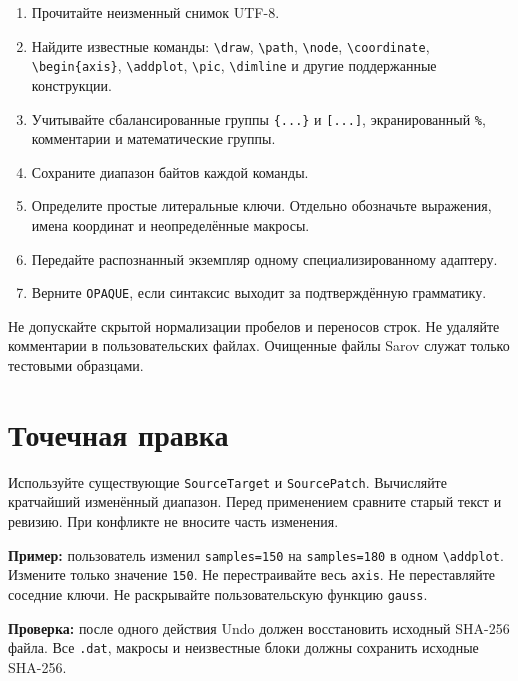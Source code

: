 \documentclass[11pt,a4paper,oneside]{scrreprt}
\providecommand{\tightlist}{\setlength{\itemsep}{0pt}\setlength{\parskip}{0pt}}
\begin{document}
\begin{enumerate}
\def\labelenumi{\arabic{enumi}.}
\tightlist
\item
  Прочитайте неизменный снимок UTF-8.
\item
  Найдите известные команды: \texttt{\textbackslash{}draw}, \texttt{\textbackslash{}path}, \texttt{\textbackslash{}node}, \texttt{\textbackslash{}coordinate}, \texttt{\textbackslash{}begin\{axis\}}, \texttt{\textbackslash{}addplot}, \texttt{\textbackslash{}pic}, \texttt{\textbackslash{}dimline} и другие поддержанные конструкции.
\item
  Учитывайте сбалансированные группы \texttt{\{...\}} и \texttt{{[}...{]}}, экранированный \texttt{\%}, комментарии и математические группы.
\item
  Сохраните диапазон байтов каждой команды.
\item
  Определите простые литеральные ключи. Отдельно обозначьте выражения, имена координат и неопределённые макросы.
\item
  Передайте распознанный экземпляр одному специализированному адаптеру.
\item
  Верните \texttt{OPAQUE}, если синтаксис выходит за подтверждённую грамматику.
\end{enumerate}

Не допускайте скрытой нормализации пробелов и переносов строк. Не удаляйте комментарии в пользовательских файлах. Очищенные файлы Sarov служат только тестовыми образцами.

\section{Точечная правка}\label{ux442ux43eux447ux435ux447ux43dux430ux44f-ux43fux440ux430ux432ux43aux430}

Используйте существующие \texttt{SourceTarget} и \texttt{SourcePatch}. Вычисляйте кратчайший изменённый диапазон. Перед применением сравните старый текст и ревизию. При конфликте не вносите часть изменения.

\textbf{Пример:} пользователь изменил \texttt{samples=150} на \texttt{samples=180} в одном \texttt{\textbackslash{}addplot}. Измените только значение \texttt{150}. Не перестраивайте весь \texttt{axis}. Не переставляйте соседние ключи. Не раскрывайте пользовательскую функцию \texttt{gauss}.

\textbf{Проверка:} после одного действия Undo должен восстановить исходный SHA-256 файла. Все \texttt{.dat}, макросы и неизвестные блоки должны сохранить исходные SHA-256.
\end{document}
